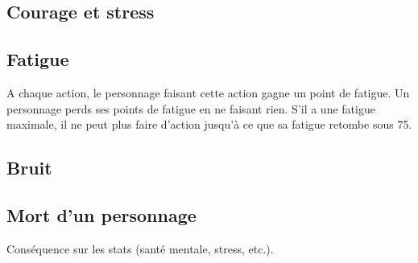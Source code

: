\subsection{Courage et stress}
\subsection{Fatigue}
A chaque action, le personnage faisant cette action gagne un point de fatigue.
Un personnage perds ses points de fatigue en ne faisant rien.
S'il a une fatigue maximale, il ne peut plus faire d'action jusqu'à ce que sa fatigue retombe sous 75.
\subsection{Bruit}
\subsection{Mort d'un personnage}
Conséquence sur les stats (santé mentale, stress, etc.).
